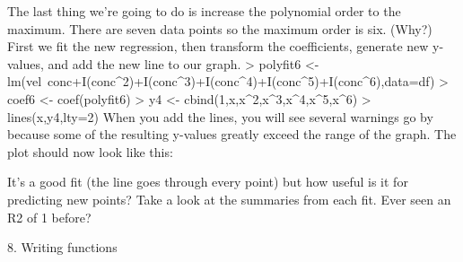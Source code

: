 The last thing we're going to do is increase the polynomial order to the maximum. There are seven data points so the maximum order is six. (Why?) First we fit the new regression, then transform the coefficients, generate new y-values, and add the new line to our graph. 
> polyfit6 <- lm(vel~conc+I(conc^2)+I(conc^3)+I(conc^4)+I(conc^5)+I(conc^6),data=df)
> coef6 <- coef(polyfit6)
> y4 <- cbind(1,x,x^2,x^3,x^4,x^5,x^6) %
> lines(x,y4,lty=2)
When you add the lines, you will see several warnings go by because some of the resulting y-values greatly exceed the range of the graph. The plot should now look like this: 

It's a good fit (the line goes through every point) but how useful is it for predicting new points? Take a look at the summaries from each fit. Ever seen an R2 of 1 before? 

8. Writing functions


